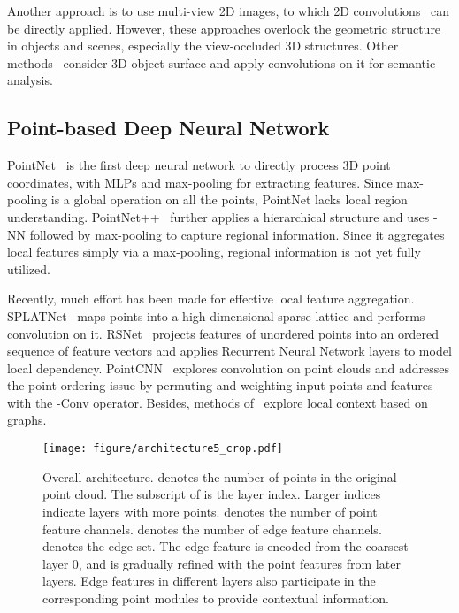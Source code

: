 \documentclass[10pt,twocolumn,letterpaper]{article}
\begin{document}
Another approach is to use multi-view 2D images, to which 2D convolutions~\cite{mvcnn, volumetric_multiview} can be directly applied. However, these approaches overlook the geometric structure in objects and scenes, especially the view-occluded 3D structures. 
Other methods~\cite{tangent_conv, pan2018convolutional} consider 3D object surface and apply convolutions on it for semantic analysis. 

\subsection{Point-based Deep Neural Network}

PointNet~\cite{pointnet} is the first deep neural network to directly process 3D point coordinates, with MLPs and max-pooling for extracting features. Since max-pooling is a global operation on all the points, PointNet lacks local region understanding. 
PointNet++~\cite{pointnet2} further applies a hierarchical structure and uses -NN followed by max-pooling to capture regional information.
Since it aggregates local features simply via a max-pooling, regional information is not yet fully utilized.

Recently, much effort has been made for effective local feature aggregation.
SPLATNet~\cite{splatnet} maps points into a high-dimensional sparse lattice and performs convolution on it. RSNet~\cite{huang2018recurrent} projects features of unordered points into an ordered sequence of feature vectors and applies Recurrent Neural Network
layers to model local dependency. PointCNN~\cite{pointcnn} explores convolution on point clouds and addresses the point ordering issue by permuting and weighting input points and features with the -Conv operator.
Besides, methods of~\cite{edgefilter, spectralconv, pointconv, dgcnn, continuousconv} explore local context based on graphs.

\begin{figure*}
	\begin{center}
		\texttt{[image: figure/architecture5\_crop.pdf]}
	\end{center}
	\vspace{-1mm}
	\caption{Overall architecture.  denotes the number of points in the original point cloud. The subscript of  is the layer index. Larger indices indicate layers with more points.  denotes the number of point feature channels.  denotes the number of edge feature channels.  denotes the edge set. The edge feature is encoded from the coarsest layer 0, and is gradually refined with the point features from later layers. Edge features in different layers also participate in the corresponding point modules to provide contextual information. }
	\label{fig_framework}
	\vspace{-1mm}
\end{figure*}
\end{document}
